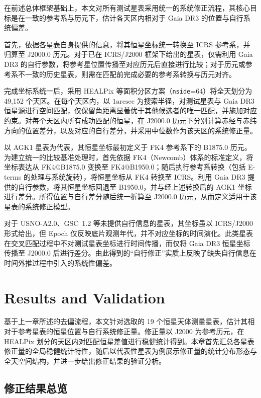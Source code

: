 \documentclass{aastex701}
\begin{document}
在前述总体框架基础上，本文对所有测试星表采用统一的系统修正流程，其核心目标是在一致的参考系与历元下，估计各天区内相对于 Gaia DR3 的位置与自行系统偏差。

首先，依据各星表自身提供的信息，将其恒星坐标统一转换至 ICRS 参考系，并归算至 J2000.0 历元。对于已在 ICRS/J2000 框架下给出的星表，仅需利用 Gaia DR3 的自行参数，将参考星位置传播至对应历元后直接进行比较；对于历元或参考系不一致的历史星表，则需在匹配前完成必要的参考系转换与历元对齐。

完成坐标系统一后，采用 HEALPix 等面积分区方案（\texttt{nside}=64）将全天划分为 49,152 个天区。在每个天区内，以 $1\mathrm{arcsec}$ 为搜索半径，对测试星表与 Gaia DR3 恒星源进行空间匹配，仅保留角距离显著优于其他候选者的唯一匹配，并施加对应约束。对每个天区内所有成功匹配的恒星，在 J2000.0 历元下分别计算赤经与赤纬方向的位置差分，以及对应的自行差分，并采用中位数作为该天区的系统修正量。

以 AGK1 星表为代表，其恒星坐标最初定义于 FK4 参考系下的 B1875.0 历元。为建立统一的比较基准处理时，首先依据 FK4（Newcomb）体系的标准定义，将坐标表达从 FK4@B1875.0 变换至 FK4@B1950.0；随后执行参考系转换（包括 E-terms 的处理与系统旋转），将恒星坐标从 FK4 转换至 ICRS。利用 Gaia DR3 提供的自行参数，将其恒星坐标回退至 B1950.0，并与经上述转换后的 AGK1 坐标进行差分。所得位置与自行差分随后统一折算至 J2000.0 历元，从而定义适用于该星表的系统修正模型。

对于 USNO-A2.0、GSC~1.2 等未提供自行信息的星表，其坐标虽以 ICRS/J2000 形式给出，但 Epoch 仅反映底片观测年代，并不对应坐标的时间演化。此类星表在交叉匹配过程中不对测试星表坐标进行时间传播，而仅将 Gaia DR3 恒星坐标传播至 J2000.0 后进行差分。由此得到的“自行修正”实质上反映了缺失自行信息在时间外推过程中引入的系统性偏差。

\section{Results and Validation} \label{sec:results}

基于上一章所述的去偏流程，本文针对选取的 19 个恒星天体测量星表，估计其相对于参考星表的恒星位置与自行系统修正量。修正量以 J2000 为参考历元，在 HEALPix 划分的天区内对匹配恒星差值进行稳健统计得到。本章首先汇总各星表修正量的全局稳健统计特性，随后以代表性星表为例展示修正量的统计分布形态与全天空间结构，并进一步给出修正结果的验证分析。

\subsection{修正结果总览} \label{subsec:global_corrections}
\end{document}
